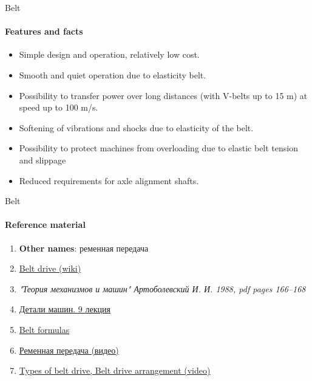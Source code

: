\documentclass[aspectratio=169]{beamer}
\begin{document}
\begin{frame}[t]{Belt}
    \framesubtitle{Features and facts}
    \begin{itemize}
        \item Simple design and operation, relatively low cost. 
        \item Smooth and quiet operation due to elasticity belt. 
        \item Possibility to transfer power over long distances (with V-belts up to 15 m) at speed up to 100 m/s. 
        \item Softening of vibrations and shocks due to elasticity of the belt. 
        \item Possibility to protect machines from overloading due to elastic belt tension and slippage  
        \item Reduced requirements for axle alignment 
        shafts.
    \end{itemize}
\end{frame}

\begin{frame}[t]{Belt}
    \framesubtitle{Reference material}
    \begin{enumerate}
        \item \textbf{Other names}: ременная передача
        \item \href{https://en.m.wikipedia.org/wiki/Belt_(mechanical)}{Belt drive (wiki)}
        \item \textit{"Теория механизмов и машин" Артоболевский И. И. 1988, pdf pages 166--168 }
        \item \href{https://studfile.net/preview/2156455/}{Детали машин. 9 лекция}
        \item \href{https://youtu.be/CP_b7bzM9nQ}{Belt formulas}
        \item \href{https://youtu.be/Lr5E-WrTajs}{Ременная передача (видео)}
        \item \href{https://youtu.be/sHtcCvaFtSQ}{Types of belt drive, Belt drive arrangement (video)}
    \end{enumerate}
\end{frame}
\end{document}
